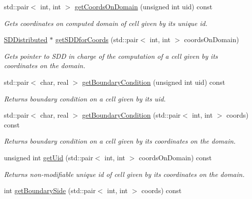 \begin{DoxyCompactItemize}
std::pair$<$ int, int $>$ \hyperlink{classDomain_a792c1fd5763b5a5d9c32d085500671fb}{getCoordsOnDomain} (unsigned int uid) const 
\begin{DoxyCompactList}\small\item\em Gets coordinates on computed domain of cell given by its unique id. \item\end{DoxyCompactList}\item 
\hyperlink{classSDDistributed}{SDDistributed} $\ast$ \hyperlink{classDomain_a893851a7caff52261beb79888d46be1f}{getSDDforCoords} (std::pair$<$ int, int $>$ coordsOnDomain)
\begin{DoxyCompactList}\small\item\em Gets pointer to SDD in charge of the computation of a cell given by its coordinates on the domain. \item\end{DoxyCompactList}\item 
std::pair$<$ char, real $>$ \hyperlink{classDomain_af320a2bc1abbef2f8f7d7f768799194f}{getBoundaryCondition} (unsigned int uid) const 
\begin{DoxyCompactList}\small\item\em Returns boundary condition on a cell given by its uid. \item\end{DoxyCompactList}\item 
std::pair$<$ char, real $>$ \hyperlink{classDomain_a7c1da36a59bd95dd5f7c91365f2372bd}{getBoundaryCondition} (std::pair$<$ int, int $>$ coords) const 
\begin{DoxyCompactList}\small\item\em Returns boundary condition on a cell given by its coordinates on the domain. \item\end{DoxyCompactList}\item 
\hypertarget{classDomain_aa94b72b9c8ab8ca8dfe15ad3744cdf13}{
unsigned int \hyperlink{classDomain_aa94b72b9c8ab8ca8dfe15ad3744cdf13}{getUid} (std::pair$<$ int, int $>$ coordsOnDomain) const }
\label{classDomain_aa94b72b9c8ab8ca8dfe15ad3744cdf13}

\begin{DoxyCompactList}\small\item\em Returns non-\/modifiable unique id of cell given by its coordinates on the domain. \item\end{DoxyCompactList}\item 
\hypertarget{classDomain_add94ccfc20fc9421c5c631823da16fc8}{
int \hyperlink{classDomain_add94ccfc20fc9421c5c631823da16fc8}{getBoundarySide} (std::pair$<$ int, int $>$ coords) const }
\label{classDomain_add94ccfc20fc9421c5c631823da16fc8}


\end{DoxyCompactItemize}
